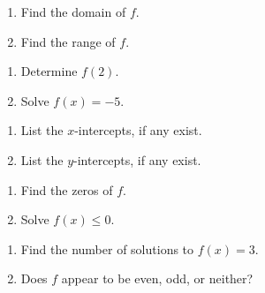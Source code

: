 \begin{multicols}{2}
\begin{enumerate}
\setcounter{enumi}{\value{HW}}

\item  Find the domain of $f$. \label{usesecondfuncgraphfirst}
\item  Find the range of $f$.

\setcounter{HW}{\value{enumi}}
\end{enumerate}
\end{multicols}

\begin{multicols}{2}
\begin{enumerate}
\setcounter{enumi}{\value{HW}}

\item  Determine $f(2)$.
\item  Solve $f(x) = -5$.

\setcounter{HW}{\value{enumi}}
\end{enumerate}
\end{multicols}

\begin{multicols}{2}
\begin{enumerate}
\setcounter{enumi}{\value{HW}}

\item  List the $x$-intercepts, if any exist.
\item  List the $y$-intercepts, if any exist.

\setcounter{HW}{\value{enumi}}
\end{enumerate}
\end{multicols}

\begin{multicols}{2}
\begin{enumerate}
\setcounter{enumi}{\value{HW}}

\item  Find the zeros of $f$.
\item  Solve $f(x) \leq 0$.

\setcounter{HW}{\value{enumi}}
\end{enumerate}
\end{multicols}

\begin{multicols}{2}
\begin{enumerate}
\setcounter{enumi}{\value{HW}}

\item  Find the number of solutions to $f(x) = 3$.
\item  Does $f$ appear to be even, odd, or neither?

\setcounter{HW}{\value{enumi}}
\end{enumerate}
\end{multicols}

